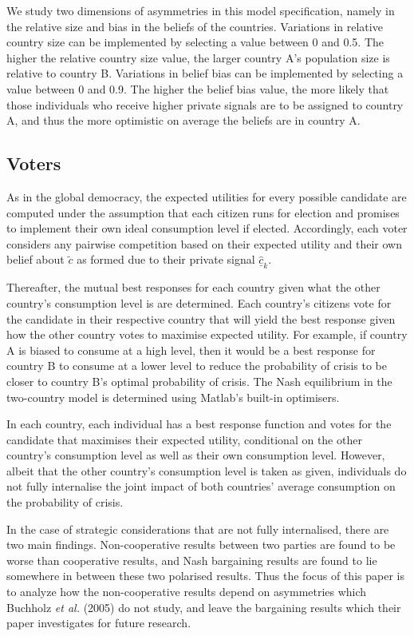 \documentclass[11pt,preprint, authoryear]{elsarticle}
\numberwithin{equation}{section}
\numberwithin{figure}{section}
\numberwithin{table}{section}
\begin{document}
We study two dimensions of asymmetries in this model specification,
namely in the relative size and bias in the beliefs of the countries.
Variations in relative country size can be implemented by selecting a
value between 0 and 0.5. The higher the relative country size value, the
larger country A's population size is relative to country B. Variations
in belief bias can be implemented by selecting a value between 0 and
0.9. The higher the belief bias value, the more likely that those
individuals who receive higher private signals are to be assigned to
country A, and thus the more optimistic on average the beliefs are in
country A.

\hypertarget{voters-1}{%
\subsection*{Voters}\label{voters-1}}

As in the global democracy, the expected utilities for every possible
candidate are computed under the assumption that each citizen runs for
election and promises to implement their own ideal consumption level if
elected. Accordingly, each voter considers any pairwise competition
based on their expected utility and their own belief about \(\tilde{c}\)
as formed due to their private signal \(\hat{\underline{c}}_k\).

Thereafter, the mutual best responses for each country given what the
other country's consumption level is are determined. Each country's
citizens vote for the candidate in their respective country that will
yield the best response given how the other country votes to maximise
expected utility. For example, if country A is biased to consume at a
high level, then it would be a best response for country B to consume at
a lower level to reduce the probability of crisis to be closer to
country B's optimal probability of crisis. The Nash equilibrium in the
two-country model is determined using Matlab's built-in optimisers.

In each country, each individual has a best response function and votes
for the candidate that maximises their expected utility, conditional on
the other country's consumption level as well as their own consumption
level. However, albeit that the other country's consumption level is
taken as given, individuals do not fully internalise the joint impact of
both countries' average consumption on the probability of crisis.

In the case of strategic considerations that are not fully internalised,
there are two main findings. Non-cooperative results between two parties
are found to be worse than cooperative results, and Nash bargaining
results are found to lie somewhere in between these two polarised
results. Thus the focus of this paper is to analyze how the
non-cooperative results depend on asymmetries which Buchholz \emph{et
al.} (2005) do not study, and leave the bargaining results which their
paper investigates for future research.
\end{document}
